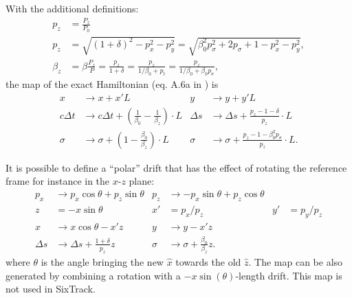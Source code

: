 \documentclass[english]{article}
\begin{document}
\noindent With the additional definitions:
\begin{align}
  p_z&=\frac{P_z}{P_0}\\
  p_z&=\sqrt{(1+\delta)^2 - p_x^2 - p_y^2}=\sqrt{\beta_0^2p_{\sigma}^2+2p_{\sigma}+1 - p_x^2 - p_y^2}, \\
  \beta_z &= \beta \frac{P_z}{P}=\frac{p_z}{1+\delta}= \frac{p_z}{1/\beta_0+p_t}=\frac{p_z}{1/\beta_0+\beta_0 p_\sigma},
\end{align}
the map of the exact Hamiltonian (eq. A.6a in \cite{heinemann95}) is
\begin{align}
  x      & \to x+x'L &
  y      & \to y+y'L \\
    c\Delta t     & \to c\Delta t + \left(\frac{1}{\beta_0}
  -\frac{1}{\beta_z}\right)\cdot L &
    \Delta s  & \to \Delta s+\frac{p_z-1-\delta}{p_z} \cdot L \\
  \sigma & \to \sigma + \left(1 - \frac{\beta_0}{\beta_z} \right) \cdot L &
  \sigma & \to \sigma + \frac{p_z -1 - \beta_0^2 p_\sigma}{p_z}  \cdot L.
\end{align}

It is possible to define a ``polar'' drift that has the effect of rotating the reference frame
\cite{forest99} for instance in the $x$-$z$ plane:
\begin{align}
p_x & \to   p_x \cos \theta + p_z \sin\theta &
p_z & \to - p_x \sin \theta + p_z \cos\theta \\
z   &= -x \sin \theta & x' &= p_x/p_z &  y' &= p_y/p_z \\
x   & \to x \cos\theta - x' z  &
y   & \to y - x' z  \\
\Delta s & \to \Delta s +\frac{1+\delta}{p_z} z &
\sigma & \to \sigma + \frac{\beta_0}{\beta_z}   z.
\end{align}
where $\theta$ is the angle bringing the new $\hat x$ towards the old $\hat z$.
The map can be also generated by combining a rotation with a $-x
\sin(\theta)$-length drift. This map is not used in SixTrack.
\end{document}
